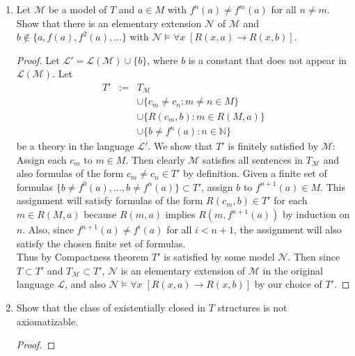 \documentclass{article}
\begin{document}
\begin{enumerate}[label={\bf Q\arabic*:}]
\begin{enumerate}
      \item Let $\mathcal{M}$ be a model of $T$ and $a\in M$ with
        $f^n(a)\neq f^m(a)$ for all $n\neq m$. Show that there is an
        elementary extension $\mathcal{N}$ of $\mathcal{M}$ and
        $b\not\in\{a,f(a),f^2(a),\ldots\}$ with $\mathcal{N}\models\forall
        x\; [R(x,a)\rightarrow R(x,b)]$.

        \begin{proof}
          Let $\mathcal{L}'=\mathcal{L}(\mathcal{M})\cup\{b\}$, where $b$
          is a constant that does not appear in $\mathcal{L}(\mathcal{M})$.
          Let
          \[\begin{array}{rrl}
            T' &:= &T_\mathcal{M} \\
              &&\cup \{c_m\neq c_n:m\neq n\in M\} \\
              &&\cup\{R(c_m,b):m\in R(M,a)\} \\
              &&\cup\{b\neq f^n(a):n\in\mathbb{N}\}
          \end{array}\]
          be a theory in the language $\mathcal{L}'$. We show that
          $T'$ is finitely satisfied by $\mathcal{M}$: Assign each $c_m$ to
          $m\in M$. Then clearly $\mathcal{M}$ satisfies all sentences in
          $T_\mathcal{M}$ and also formulas of the form $c_m\neq c_n\in
          T'$ by definition. Given a finite set of formulas
          $\{b\neq f^{0}(a),\ldots,b\neq f^{n}(a)\}\subset T'$, assign $b$
          to $f^{n+1}(a)\in M$. This assignment will satisfy formulas of
          the form $R(c_m,b)\in T'$ for each $m\in R(M,a)$ because $R(m,a)$
          implies $R(m,f^{n+1}(a))$ by induction on $n$. Also, since
          $f^{n+1}(a)\neq f^i(a)$ for all $i<n+1$, the assignment will also
          satisfy the chosen finite set of formulas. \\

          Thus by Compactness theorem $T'$ is satisfied by some model
          $\mathcal{N}$. Then since $T\subset T'$ and $T_\mathcal{M}\subset
          T'$, $\mathcal{N}$ is an elementary extension of $\mathcal{M}$ in
          the original language $\mathcal{L}$, and also
          $\mathcal{N}\models\forall x\; [R(x,a)\rightarrow R(x,b)]$ by our
          choice of $T'$.
        \end{proof}

      \item Show that the class of existentially closed in $T$ structures
        is not axiomatizable.
        \begin{proof}
        \end{proof}
    \end{enumerate}
\end{enumerate}
\end{document}
